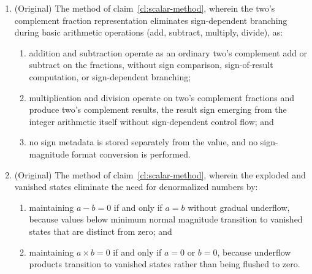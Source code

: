 \documentclass[12pt,letter]{article}
\begin{document}
\begin{enumerate}
    \item (Original) The method of claim~\ref{cl:scalar-method}, wherein the two's complement fraction representation eliminates sign-dependent branching during basic arithmetic operations (add, subtract, multiply, divide), as:
          \begin{enumerate}
              \item addition and subtraction operate as an ordinary two's complement add or subtract on the fractions, without sign comparison, sign-of-result computation, or sign-dependent branching;
              \item multiplication and division operate on two's complement fractions and produce two's complement results, the result sign emerging from the integer arithmetic itself without sign-dependent control flow; and
              \item no sign metadata is stored separately from the value, and no sign-magnitude format conversion is performed.
          \end{enumerate}

    \item (Original) The method of claim~\ref{cl:scalar-method}, wherein the exploded and vanished states eliminate the need for denormalized numbers by:
          \begin{enumerate}
              \item maintaining $a - b = 0$ if and only if $a = b$ without gradual underflow, because values below minimum normal magnitude transition to vanished states that are distinct from zero; and
              \item maintaining $a \times b = 0$ if and only if $a = 0$ or $b = 0$, because underflow products transition to vanished states rather than being flushed to zero.
          \end{enumerate}


\end{enumerate}
\end{document}
